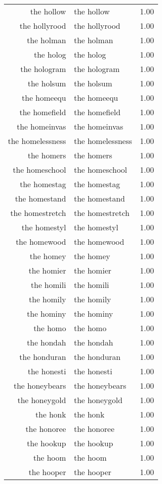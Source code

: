 \begin{table}[ht]
\begin{tabular}{rlr}
  the hollow & the hollow & 1.00 \\ 
  the hollyrood & the hollyrood & 1.00 \\ 
  the holman & the holman & 1.00 \\ 
  the holog & the holog & 1.00 \\ 
  the hologram & the hologram & 1.00 \\ 
  the holsum & the holsum & 1.00 \\ 
  the homeequ & the homeequ & 1.00 \\ 
  the homefield & the homefield & 1.00 \\ 
  the homeinvas & the homeinvas & 1.00 \\ 
  the homelessness & the homelessness & 1.00 \\ 
  the homers & the homers & 1.00 \\ 
  the homeschool & the homeschool & 1.00 \\ 
  the homestag & the homestag & 1.00 \\ 
  the homestand & the homestand & 1.00 \\ 
  the homestretch & the homestretch & 1.00 \\ 
  the homestyl & the homestyl & 1.00 \\ 
  the homewood & the homewood & 1.00 \\ 
  the homey & the homey & 1.00 \\ 
  the homier & the homier & 1.00 \\ 
  the homili & the homili & 1.00 \\ 
  the homily & the homily & 1.00 \\ 
  the hominy & the hominy & 1.00 \\ 
  the homo & the homo & 1.00 \\ 
  the hondah & the hondah & 1.00 \\ 
  the honduran & the honduran & 1.00 \\ 
  the honesti & the honesti & 1.00 \\ 
  the honeybears & the honeybears & 1.00 \\ 
  the honeygold & the honeygold & 1.00 \\ 
  the honk & the honk & 1.00 \\ 
  the honoree & the honoree & 1.00 \\ 
  the hookup & the hookup & 1.00 \\ 
  the hoom & the hoom & 1.00 \\ 
  the hooper & the hooper & 1.00 \\ 

\end{tabular}
\end{table}
